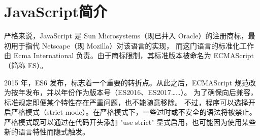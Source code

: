 \section{JavaScript简介}
严格来说，JavaScript 是 Sun Microsystems（现已并入 Oracle）的注册商标，最初用于指代 Netscape（现 Mozilla）对该语言的实现，
而这门语言的标准化工作由 Ecma International 负责。由于商标限制，其标准版本被命名为 ECMAScript（简称 ES）。

2015 年，ES6 发布，标志着一个重要的转折点。从此之后，ECMAScript 规范改为按年发布，并以年份作为版本号（ES2016、ES2017……）。
为了确保向后兼容，标准规定即便某个特性存在严重问题，也不能随意移除。
不过，程序可以选择开启严格模式（strict mode）。在严格模式下，一些过时或不安全的语法将被禁止。
严格模式既可以通过在代码开头添加 "use strict" 显式启用，也可能因为使用某些新的语言特性而隐式触发。



